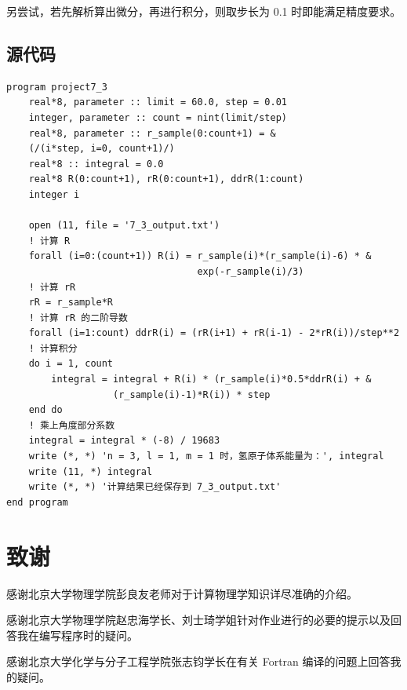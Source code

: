 \documentclass{ctexart}
\begin{document}
另尝试，若先解析算出微分，再进行积分，则取步长为 0.1 时即能满足精度要求。
\subsection{源代码}
\begin{lstlisting}
program project7_3
	real*8, parameter :: limit = 60.0, step = 0.01
	integer, parameter :: count = nint(limit/step)
	real*8, parameter :: r_sample(0:count+1) = &
	(/(i*step, i=0, count+1)/)
	real*8 :: integral = 0.0
	real*8 R(0:count+1), rR(0:count+1), ddrR(1:count)
	integer i

	open (11, file = '7_3_output.txt')
	! 计算 R
	forall (i=0:(count+1)) R(i) = r_sample(i)*(r_sample(i)-6) * &
	                              exp(-r_sample(i)/3)
	! 计算 rR
	rR = r_sample*R
	! 计算 rR 的二阶导数
	forall (i=1:count) ddrR(i) = (rR(i+1) + rR(i-1) - 2*rR(i))/step**2
	! 计算积分
	do i = 1, count
		integral = integral + R(i) * (r_sample(i)*0.5*ddrR(i) + &
			       (r_sample(i)-1)*R(i)) * step
	end do
	! 乘上角度部分系数
	integral = integral * (-8) / 19683
	write (*, *) 'n = 3, l = 1, m = 1 时，氢原子体系能量为：', integral
	write (11, *) integral
	write (*, *) '计算结果已经保存到 7_3_output.txt'
end program
\end{lstlisting}
\newpage
\appendix
\section{致谢}
感谢北京大学物理学院彭良友老师对于计算物理学知识详尽准确的介绍。

感谢北京大学物理学院赵忠海学长、刘士琦学姐针对作业进行的必要的提示以及回答我在编写程序时的疑问。

感谢北京大学化学与分子工程学院张志钧学长在有关 Fortran 编译的问题上回答我的疑问。
\end{document}
